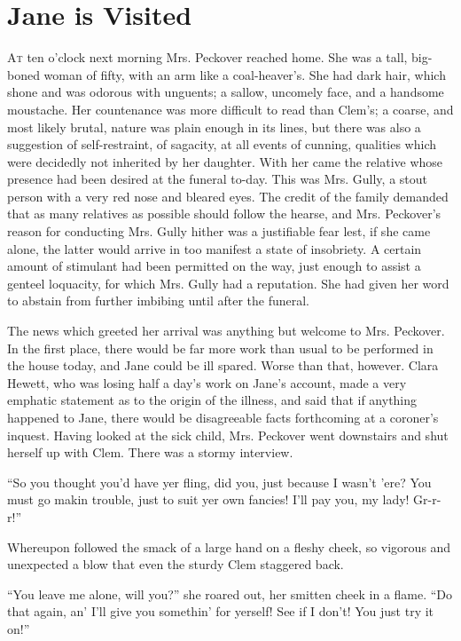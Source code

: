 \chapter {Jane is Visited}

\textsc{At} ten o'clock next morning Mrs. Peckover reached home. She was
a tall, big-boned woman of fifty, with an arm like a coal-heaver's. She
had dark hair, which shone and was odorous with unguents; a sallow,
uncomely face, and a handsome moustache. Her countenance was more
difficult to read than Clem's; a coarse, and most likely brutal, nature
was plain enough in its lines, but there was also a suggestion of
self-restraint, of sagacity, at all events of cunning, qualities which
were decidedly not inherited by her daughter. With her came the relative
whose presence had been desired at the funeral to-day. This was Mrs.
Gully, a stout person with a very red nose and bleared eyes. The
{\protect\hypertarget{93}{}{}}credit of the family demanded that as many
relatives as possible should follow the hearse, and Mrs. Peckover's
reason for conducting Mrs. Gully hither was a justifiable fear lest, if
she came alone, the latter would arrive in too manifest a state of
insobriety. A certain amount of stimulant had been permitted on the way,
just enough to assist a genteel loquacity, for which Mrs. Gully had a
reputation. She had given her word to abstain from further imbibing
until after the funeral.

The news which greeted her arrival was anything but welcome to Mrs.
Peckover. In the first place, there would be far more work than usual to
be performed in the house today, and Jane could be ill spared. Worse
than that, however. Clara Hewett, who was losing half a day's work on
Jane's account, made a very emphatic statement as to the origin of the
illness, and said that if anything happened to Jane, there would be
disagreeable facts forthcoming at a coroner's inquest. Having looked at
the sick child, Mrs. Peckover went downstairs and shut
{\protect\hypertarget{94}{}{}}herself up with Clem. There was a stormy
interview.

``So you thought you'd have yer fling, did you, just because I wasn't
'ere? You must go makin trouble, just to suit yer own fancies! I'll pay
you, my lady! Gr-r-r!''

Whereupon followed the smack of a large hand on a fleshy cheek, so
vigorous and unexpected a blow that even the sturdy Clem staggered back.

``You leave me alone, will you?'' she roared out, her smitten cheek in a
flame. ``Do that again, an' I'll give you somethin' for yerself! See if
I don't! You just try it on!''

